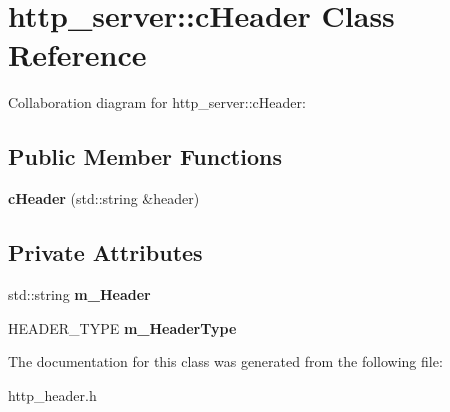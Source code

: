 \hypertarget{classhttp__server_1_1cHeader}{\section{http\-\_\-server\-:\-:c\-Header Class Reference}
\label{classhttp__server_1_1cHeader}
}


Collaboration diagram for http\-\_\-server\-:\-:c\-Header\-:
\subsection*{Public Member Functions}
\begin{DoxyCompactItemize}
\item 
\hypertarget{classhttp__server_1_1cHeader_a0da2d042d4c8377ab03e5e5db07e9851}{{\bfseries c\-Header} (std\-::string \&header)}\label{classhttp__server_1_1cHeader_a0da2d042d4c8377ab03e5e5db07e9851}

\end{DoxyCompactItemize}
\subsection*{Private Attributes}
\begin{DoxyCompactItemize}
\item 
\hypertarget{classhttp__server_1_1cHeader_ae240317901e48fb784522ecfdd0187f1}{std\-::string {\bfseries m\-\_\-\-Header}}\label{classhttp__server_1_1cHeader_ae240317901e48fb784522ecfdd0187f1}

\item 
\hypertarget{classhttp__server_1_1cHeader_a549796c5afa30e103a14e69ce68bedab}{H\-E\-A\-D\-E\-R\-\_\-\-T\-Y\-P\-E {\bfseries m\-\_\-\-Header\-Type}}\label{classhttp__server_1_1cHeader_a549796c5afa30e103a14e69ce68bedab}

\end{DoxyCompactItemize}


The documentation for this class was generated from the following file\-:\begin{DoxyCompactItemize}
\item 
http\-\_\-header.\-h\end{DoxyCompactItemize}
